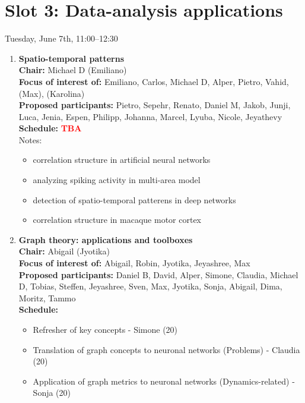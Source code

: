 \documentclass[10pt, a4paper,twoside,american]{article}
\newcommand{\alert}[1]{\textcolor{red}{\bf #1}}
\begin{document}
\section*{Slot 3: Data-analysis applications}
Tuesday, June 7th, 11:00--12:30

\begin{enumerate}[resume]
\item {\large\bf Spatio-temporal patterns}\\[1ex]
  {\bf Chair:} Michael D (Emiliano)\\[1ex]
  {\bf Focus of interest of:} Emiliano, Carlos, Michael D, Alper, Pietro, Vahid, (Max), (Karolina)\\[1ex]
  {\bf Proposed participants:} Pietro, Sepehr, Renato, Daniel M, Jakob, Junji, Luca, Jenia, Espen, Philipp, Johanna, Marcel, Lyuba, Nicole, Jeyathevy\\[1ex]
  {\bf Schedule:} \alert{TBA}\\[1ex]
  Notes:
  \begin{itemize}
  \item correlation structure in artificial neural networks
  \item analyzing spiking activity in multi-area model
  \item detection of spatio-temporal patterens in deep networks
  \item correlation structure in macaque motor cortex
  \end{itemize}
\item {\large\bf Graph theory: applications and toolboxes}\\[1ex]
  {\bf Chair:} Abigail (Jyotika)\\[1ex]
  {\bf Focus of interest of:} Abigail, Robin, Jyotika, Jeyashree, Max\\[1ex]
  {\bf Proposed participants:} Daniel B, David, Alper, Simone, Claudia, Michael D, Tobias, Steffen, Jeyashree, Sven, Max, Jyotika, Sonja, Abigail, Dima, Moritz, Tammo\\[1ex]
  {\bf Schedule:} %
  \begin{itemize}
  \item Refresher of key concepts - Simone (20)                 
  \item Translation of graph concepts to neuronal networks (Problems) - Claudia (20)
  \item Application of graph metrics to neuronal networks (Dynamics-related) - Sonja (20)

\end{itemize}
\end{enumerate}
\end{document}
